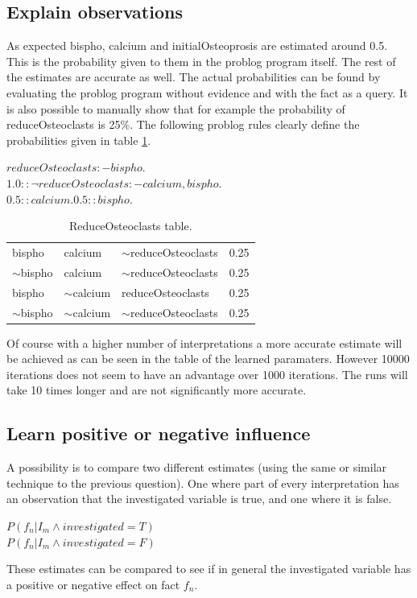 \documentclass{article}
\begin{document}
\subsection{Explain observations}
As expected bispho, calcium and initialOsteoprosis are estimated around 0.5. This is the probability given to them in the problog program itself. The rest of the estimates are accurate as well. The actual probabilities can be found by evaluating the problog program without evidence and with the fact as a query. It is also possible to manually show that for example the probability of reduceOsteoclasts is 25\%. The  following problog rules clearly define the probabilities given in table \ref{tab:reduce}.
\begin{center}
    $reduceOsteoclasts :- bispho.$\\
    $1.0::\neg reduceOsteoclasts :- calcium , bispho.$\\
    $0.5::calcium. 0.5::bispho.$
\end{center}
\begin{table}[h!]
    \begin{center}
    \begin{tabular}{|ll|l|l|}
    \hline
    bispho       & calcium       & $\sim$reduceOsteoclasts & 0.25 \\
    $\sim$bispho & calcium       & $\sim$reduceOsteoclasts & 0.25 \\
    bispho       & $\sim$calcium & reduceOsteoclasts       & 0.25 \\
    $\sim$bispho & $\sim$calcium & $\sim$reduceOsteoclasts &     0.25 \\ \hline
    \end{tabular}
    \caption{ReduceOsteoclasts table.}
    \label{tab:reduce}
    \end{center}
\end{table}

Of course with a higher number of interpretations a more accurate estimate will be achieved as can be seen in the table of the learned paramaters. However 10000 iterations does not seem to have an advantage over 1000 iterations. The runs will take 10 times longer and are not significantly more accurate. 

\subsection{Learn positive or negative influence}
A possibility is to compare two different estimates (using the same or similar technique to the previous question). One where part of every interpretation has an observation that the investigated variable is true, and one where it is false.
\begin{center}
    $P(f_{n}|I_{m} \land investigated=T)$\\
    $P(f_{n}|I_{m} \land investigated=F)$
\end{center}
These estimates can be compared to see if in general the investigated variable has a positive or negative effect on fact $f_{n}$.
\end{document}
